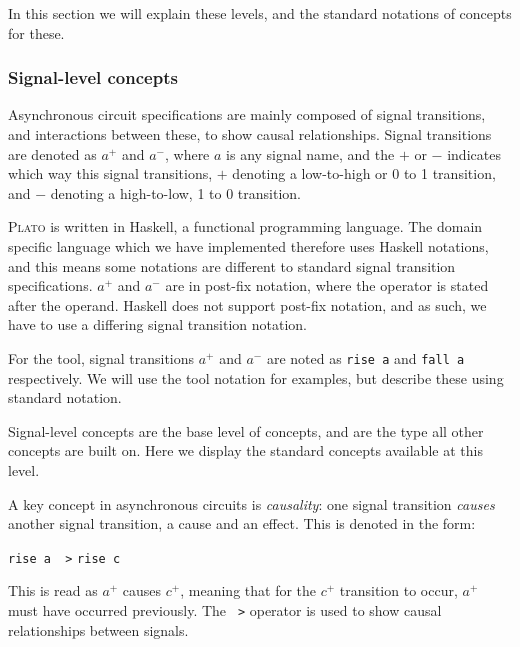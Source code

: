 \documentclass[british,conference,compsoc]{IEEEtran}
\newcommand{\noun}[1]{\textsc{#1}}
\begin{document}
In this section we will explain these levels, and the standard notations of 
concepts for these. 

\vspace{-2mm}

\subsubsection{\label{signal-level}Signal-level concepts}Asynchronous circuit 
specifications are mainly composed of signal transitions, and interactions 
between these, to show causal relationships. Signal transitions are denoted as 
$a^{+}$ and $a^{-}$, where $a$ is any signal name, and 
the $+$ or $-$ indicates which way this signal transitions, $+$ denoting a 
low-to-high or 0 to 1 transition, and $-$ denoting a high-to-low, 1 to 0 
transition. 

\noun{Plato} is written in Haskell, a functional programming language. The 
domain specific language which we have implemented therefore uses Haskell 
notations, and this means some notations are different to standard signal 
transition specifications. $a^{+}$ and $a^{-}$ are in post-fix notation, where 
the operator is stated after the operand. Haskell does not support post-fix 
notation, and as such, we have to use a differing signal transition notation. 

For the tool, signal transitions $a^{+}$ and $a^{-}$ are noted as \texttt{rise a} and 
\texttt{fall a} respectively. We will use the tool notation for examples, but 
describe these using standard notation.

Signal-level concepts are the base level of concepts, and are 
the type all other concepts are built on. Here we display the standard concepts
available at this level.

A key concept in asynchronous circuits is \emph{causality}:
one signal transition \emph{causes} another signal transition, a cause and an 
effect. This is denoted in the form: 

\vspace{-1mm}

\begin{center}
{\texttt{rise a ~>} \texttt{rise c}}
\end{center}


This is read as $a^{+}$ causes $c^{+}$, meaning that for the $c^{+}$ transition 
to occur, $a^{+}$ must have occurred previously. The 
\texttt{~>}
operator is used to show causal relationships between signals.
 
\end{document}
